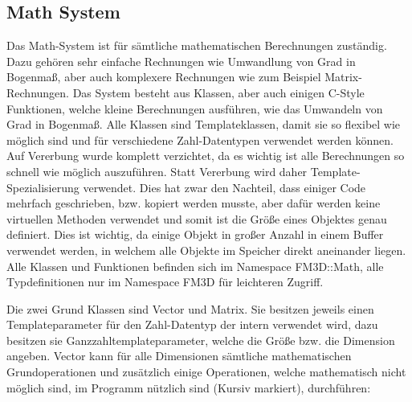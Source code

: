 \subsection{Math System}

Das Math-System ist für sämtliche mathematischen Berechnungen zuständig. Dazu gehören sehr einfache Rechnungen wie Umwandlung von Grad in Bogenmaß, aber auch komplexere Rechnungen wie zum Beispiel Matrix-Rechnungen. 
Das System besteht aus Klassen, aber auch einigen C-Style Funktionen, welche kleine Berechnungen ausführen, wie das Umwandeln von Grad in Bogenmaß. Alle Klassen sind Templateklassen, damit sie so flexibel wie möglich sind und für verschiedene Zahl-Datentypen verwendet werden können. Auf Vererbung wurde komplett verzichtet, da es wichtig ist alle Berechnungen so schnell wie möglich auszuführen. Statt Vererbung wird daher Template-Spezialisierung verwendet. Dies hat zwar den Nachteil, dass einiger Code mehrfach geschrieben, bzw. kopiert werden musste, aber dafür werden keine virtuellen Methoden verwendet und somit ist die Größe eines Objektes genau definiert. Dies ist wichtig, da einige Objekt in großer Anzahl in einem Buffer verwendet werden, in welchem alle Objekte im Speicher direkt aneinander liegen. Alle Klassen und Funktionen befinden sich im Namespace FM3D::Math, alle Typdefinitionen nur im Namespace FM3D für leichteren Zugriff.

Die zwei Grund Klassen sind Vector und Matrix. Sie besitzen jeweils einen Templateparameter für den Zahl-Datentyp der intern verwendet wird, dazu besitzen sie Ganzzahltemplateparameter, welche die Größe bzw. die Dimension angeben. Vector kann für alle Dimensionen sämtliche mathematischen Grundoperationen und zusätzlich einige Operationen, welche mathematisch nicht möglich sind, im Programm nützlich sind (Kursiv markiert), durchführen:

